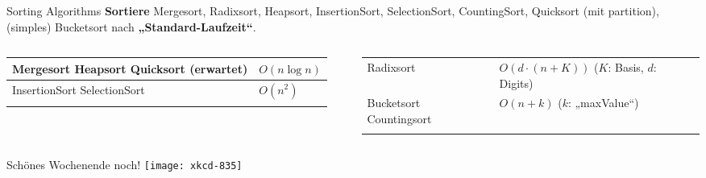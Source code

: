 \begin{frame}{Sorting Algorithms}
	\textbf{Sortiere} Mergesort, Radixsort, Heapsort, InsertionSort, SelectionSort, CountingSort, Quicksort {\small (mit partition)}, (simples) Bucketsort nach \textbf{„Standard-Laufzeit“}. \\
	\pause
	\forcenewline
	\begin{columns}
		\hspace{.2\baselineskip}
		\begin{tabular}{m{.487\linewidth} | m{.3\linewidth} }
			\hhline{=|=}
			Mergesort \newline
			Heapsort \newline 
			Quicksort (erwartet) & $O(n \log n)$ \\
			\hline 
			InsertionSort \newline 
			SelectionSort & $O(n^2)$ \\
			\hhline{=|=}
		\end{tabular}
		\hspace{-1\baselineskip}
		\begin{tabular}{m{.37\linewidth} | m{.47\linewidth} }
			\hhline{=|=}
			Radixsort & $O(d \cdot (n + K))$ \newline ($K$: Basis, \newline $d$: Digits)\\
			\hhline{=|=}
			Bucketsort \newline
			Countingsort & $O(n+k)$ \newline ($k$: „maxValue“) \\
			\hhline{=|=}
		\end{tabular}
	\end{columns}
\end{frame}

\begin{frame}{Schönes Wochenende noch! \smiley}
	\centering
	\texttt{[image: xkcd-835]}
\end{frame}


